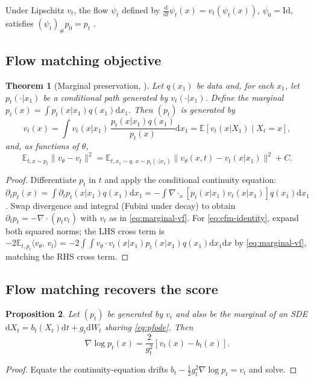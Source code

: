 \documentclass[11pt,letterpaper]{article}
\theoremstyle{plain}
\newtheorem{theorem}{Theorem}[section]
\newtheorem{proposition}[theorem]{Proposition}
\theoremstyle{definition}
\theoremstyle{remark}
\newcommand{\E}{\mathbb{E}}
\newcommand{\dd}{\mathrm{d}}
\newcommand{\grad}{\nabla}
\newcommand{\divg}{\nabla\cdot}
\newcommand{\inner}[2]{\langle #1,\,#2\rangle}
\newcommand{\norm}[1]{\lVert #1\rVert}
\begin{document}
Under Lipschitz $v_t$, the flow $\psi_t$ defined by
$\frac{\dd}{\dd t}\psi_t(x)=v_t(\psi_t(x))$, $\psi_0=\mathrm{Id}$, satisfies
$(\psi_t)_\#p_0=p_t$ \citep[Thm.~8.2.1]{ambrosio2008gradient}.

\subsection{Flow matching objective}

\begin{theorem}[Marginal preservation, \citealt{lipman2023flow}]\label{thm:cfm-app}
Let $q(x_1)$ be data and, for each $x_1$, let $p_t(\cdot|x_1)$ be a
conditional path generated by $v_t(\cdot|x_1)$. Define the marginal
$p_t(x)=\int p_t(x|x_1)q(x_1)\dd x_1$. Then $(p_t)$ is generated by
\begin{equation}
  v_t(x)=\int v_t(x|x_1)\,\frac{p_t(x|x_1)q(x_1)}{p_t(x)}\dd x_1
        =\E[v_t(x|X_1)\mid X_t=x],
  \label{eq:marginal-vf}
\end{equation}
and, as functions of $\theta$,
\begin{equation}
  \E_{t,x\sim p_t}\norm{v_\theta-v_t}^2
  =\E_{t,x_1\sim q,\,x\sim p_t(\cdot|x_1)}\norm{v_\theta(x,t)-v_t(x|x_1)}^2+C.
  \label{eq:cfm-identity}
\end{equation}
\end{theorem}
\begin{proof}
Differentiate $p_t$ in $t$ and apply the conditional continuity equation:
$\partial_tp_t(x)=\int\partial_tp_t(x|x_1)q(x_1)\dd x_1
=-\int\divg_x[p_t(x|x_1)v_t(x|x_1)]q(x_1)\dd x_1$. Swap divergence and
integral (Fubini under decay) to obtain $\partial_tp_t=-\divg(p_t v_t)$
with $v_t$ as in \eqref{eq:marginal-vf}.
For \eqref{eq:cfm-identity}, expand both squared norms; the LHS cross term is
$-2\E_{t,p_t}\inner{v_\theta}{v_t}=-2\int\!\!\int v_\theta\cdot v_t(x|x_1)p_t(x|x_1)q(x_1)\dd x_1\dd x$
by \eqref{eq:marginal-vf}, matching the RHS cross term.
\end{proof}

\subsection{Flow matching recovers the score}

\begin{proposition}\label{prop:fm-score}
Let $(p_t)$ be generated by $v_t$ and also be the marginal of an SDE
$\dd X_t=b_t(X_t)\dd t+g_t\dd W_t$ sharing \eqref{eq:pfode}. Then
\begin{equation}
  \grad\log p_t(x)=\frac{2}{g_t^2}[v_t(x)-b_t(x)].
\end{equation}
\end{proposition}
\begin{proof}
Equate the continuity-equation drifts
$b_t-\tfrac12 g_t^2\grad\log p_t=v_t$ and solve.
\end{proof}
\end{document}
